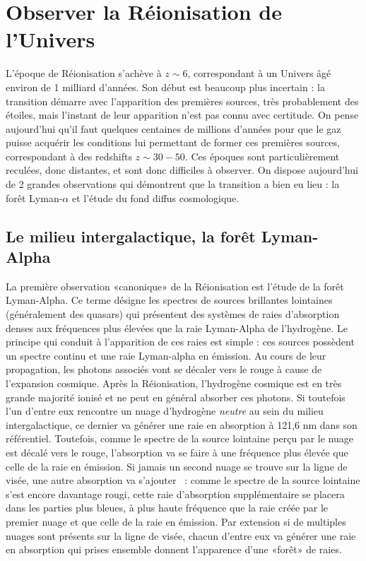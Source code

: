 \section{Observer la Réionisation de l'Univers}
L'époque de Réionisation s'achève à $z\sim 6$, correspondant à un Univers âgé environ de 1 milliard d'années. Son début est beaucoup plus incertain : la transition démarre avec l'apparition des premières sources, très probablement des étoiles, mais l'instant de leur apparition n'est pas connu avec certitude. On pense aujourd'hui qu'il faut quelques centaines de millions d'années pour que le gaz puisse acquérir les conditions lui permettant de former ces premières sources, correspondant à des redshifts $z\sim 30- 50$. Ces époques sont particulièrement reculées, donc distantes, et sont donc difficiles à observer.  On dispose aujourd'hui de 2 grandes observations qui démontrent que la transition a bien eu lieu : la forêt Lyman-$\alpha$ et l'étude du fond diffus cosmologique.

\subsection{Le milieu intergalactique, la forêt Lyman-Alpha}
La première observation «canonique» de la Réionisation est l'étude de la forêt Lyman-Alpha. Ce terme désigne les spectres de sources brillantes lointaines (généralement des quasars) qui présentent des systèmes de raies d'absorption denses aux fréquences plus élevées que la raie Lyman-Alpha de l'hydrogène. Le principe qui conduit à l'apparition de ces raies est simple : ces sources possèdent un spectre continu et une raie Lyman-alpha en émission. Au cours de leur propagation, les photons associés vont se décaler vers le rouge à cause de l'expansion cosmique. Après la Réionisation, l'hydrogène cosmique est en très grande majorité ionisé et ne peut en général absorber ces photons. Si toutefois l'un d'entre eux rencontre un nuage d'hydrogène \textit{neutre} au sein du milieu intergalactique, ce dernier va générer une raie en absorption à 121,6 nm dans son référentiel. Toutefois, comme le spectre de la source lointaine perçu par le nuage est décalé vers le rouge, l'absorption va se faire à une fréquence plus élevée que celle de la raie en émission. Si jamais un second nuage se trouve sur la ligne de visée, une autre absorption va s'ajouter ~: comme le spectre de la source lointaine s'est encore davantage rougi, cette raie d'absorption supplémentaire se placera dans les parties plus bleues, à plus haute fréquence que la raie créée par le premier nuage et que celle de la raie en émission. Par extension si de multiples nuages sont présents sur la ligne de visée, chacun d'entre eux va générer une raie en absorption qui prises ensemble donnent l'apparence d'une «forêt» de raies.

